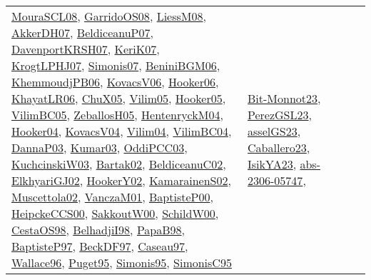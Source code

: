 {\begin{longtable}{llp{6cm}p{6cm}p{6cm}}
\href{papers/MouraSCL08.pdf}{MouraSCL08}\cite{MouraSCL08}, \href{articles/GarridoOS08.pdf}{GarridoOS08}\cite{GarridoOS08}, \href{articles/LiessM08.pdf}{LiessM08}\cite{LiessM08}, \href{papers/AkkerDH07.pdf}{AkkerDH07}\cite{AkkerDH07}, \href{papers/BeldiceanuP07.pdf}{BeldiceanuP07}\cite{BeldiceanuP07}, \href{papers/DavenportKRSH07.pdf}{DavenportKRSH07}\cite{DavenportKRSH07}, \href{papers/KeriK07.pdf}{KeriK07}\cite{KeriK07}, \href{papers/KrogtLPHJ07.pdf}{KrogtLPHJ07}\cite{KrogtLPHJ07}, \href{articles/Simonis07.pdf}{Simonis07}\cite{Simonis07}, \href{papers/BeniniBGM06.pdf}{BeniniBGM06}\cite{BeniniBGM06}, \href{papers/KhemmoudjPB06.pdf}{KhemmoudjPB06}\cite{KhemmoudjPB06}, \href{papers/KovacsV06.pdf}{KovacsV06}\cite{KovacsV06}, \href{articles/Hooker06.pdf}{Hooker06}\cite{Hooker06}, \href{articles/KhayatLR06.pdf}{KhayatLR06}\cite{KhayatLR06}, \href{papers/ChuX05.pdf}{ChuX05}\cite{ChuX05}, \href{papers/Vilim05.pdf}{Vilim05}\cite{Vilim05}, \href{articles/Hooker05.pdf}{Hooker05}\cite{Hooker05}, \href{articles/VilimBC05.pdf}{VilimBC05}\cite{VilimBC05}, \href{articles/ZeballosH05.pdf}{ZeballosH05}\cite{ZeballosH05}, \href{papers/HentenryckM04.pdf}{HentenryckM04}\cite{HentenryckM04}, \href{papers/Hooker04.pdf}{Hooker04}\cite{Hooker04}, \href{papers/KovacsV04.pdf}{KovacsV04}\cite{KovacsV04}, \href{papers/Vilim04.pdf}{Vilim04}\cite{Vilim04}, \href{papers/VilimBC04.pdf}{VilimBC04}\cite{VilimBC04}, \href{papers/DannaP03.pdf}{DannaP03}\cite{DannaP03}, \href{papers/Kumar03.pdf}{Kumar03}\cite{Kumar03}, \href{papers/OddiPCC03.pdf}{OddiPCC03}\cite{OddiPCC03}, \href{articles/KuchcinskiW03.pdf}{KuchcinskiW03}\cite{KuchcinskiW03}, \href{papers/Bartak02.pdf}{Bartak02}\cite{Bartak02}, \href{papers/BeldiceanuC02.pdf}{BeldiceanuC02}\cite{BeldiceanuC02}, \href{papers/ElkhyariGJ02.pdf}{ElkhyariGJ02}\cite{ElkhyariGJ02}, \href{papers/HookerY02.pdf}{HookerY02}\cite{HookerY02}, \href{papers/KamarainenS02.pdf}{KamarainenS02}\cite{KamarainenS02}, \href{papers/Muscettola02.pdf}{Muscettola02}\cite{Muscettola02}, \href{papers/VanczaM01.pdf}{VanczaM01}\cite{VanczaM01}, \href{articles/BaptisteP00.pdf}{BaptisteP00}\cite{BaptisteP00}, \href{articles/HeipckeCCS00.pdf}{HeipckeCCS00}\cite{HeipckeCCS00}, \href{articles/SakkoutW00.pdf}{SakkoutW00}\cite{SakkoutW00}, \href{articles/SchildW00.pdf}{SchildW00}\cite{SchildW00}, \href{papers/CestaOS98.pdf}{CestaOS98}\cite{CestaOS98}, \href{articles/BelhadjiI98.pdf}{BelhadjiI98}\cite{BelhadjiI98}, \href{articles/PapaB98.pdf}{PapaB98}\cite{PapaB98}, \href{papers/BaptisteP97.pdf}{BaptisteP97}\cite{BaptisteP97}, \href{papers/BeckDF97.pdf}{BeckDF97}\cite{BeckDF97}, \href{papers/Caseau97.pdf}{Caseau97}\cite{Caseau97}, \href{articles/Wallace96.pdf}{Wallace96}\cite{Wallace96}, \href{papers/Puget95.pdf}{Puget95}\cite{Puget95}, \href{papers/Simonis95.pdf}{Simonis95}\cite{Simonis95}, \href{papers/SimonisC95.pdf}{SimonisC95}\cite{SimonisC95} & \href{papers/Bit-Monnot23.pdf}{Bit-Monnot23}\cite{Bit-Monnot23}, \href{papers/PerezGSL23.pdf}{PerezGSL23}\cite{PerezGSL23}, \href{papers/asselGS23.pdf}{asselGS23}\cite{asselGS23}, \href{articles/Caballero23.pdf}{Caballero23}\cite{Caballero23}, \href{articles/IsikYA23.pdf}{IsikYA23}\cite{IsikYA23}, \href{articles/abs-2306-05747.pdf}{abs-2306-05747}\cite{abs-2306-05747}, 
\end{longtable}}
